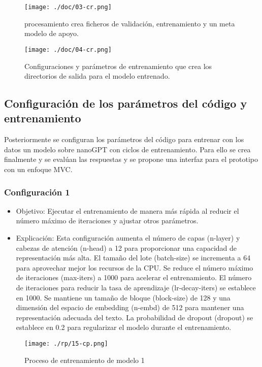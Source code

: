 \begin{figure}[H]
   \centering %
       \texttt{[image: ./doc/03-cr.png]} 
   \caption{procesamiento crea  ficheros de validación, entrenamiento y un meta modelo de apoyo.  \cite{}}
  \label{figure:Etapa de encoder}  %
\end{figure}
\begin{figure}[H]
   \centering %
       \texttt{[image: ./doc/04-cr.png]} 
   \caption{Configuraciones y parámetros de entrenamiento que crea los directorios de salida para el modelo entrenado.  \cite{}}
  \label{figure:Configuraciónes de parámetros}  %
\end{figure}
\subsection{Configuración de los parámetros del código y entrenamiento}\label{figure:Entrenamiento} 
Posteriormente se configuran los parámetros del código para entrenar con los datos un modelo sobre nanoGPT con ciclos de entrenamiento. Para ello se crea finalmente y se evalúan las respuestas y se propone una interfaz para el prototipo con un enfoque MVC.
\subsubsection{Configuración 1}\label{section:Configuracion1} 
\begin{itemize}
        \item   Objetivo: Ejecutar el entrenamiento de manera más rápida al reducir el número máximo de iteraciones y ajustar otros parámetros.
        \item   Explicación: Esta configuración aumenta el número de capas (n-layer) y cabezas de atención (n-head) a 12 para proporcionar una capacidad de representación más alta. El tamaño del lote (batch-size) se incrementa a 64 para aprovechar mejor los recursos de la CPU. Se reduce el número máximo de iteraciones (max-iters) a 1000 para acelerar el entrenamiento. El número de iteraciones para reducir la tasa de aprendizaje (lr-decay-iters) se establece en 1000. Se mantiene un tamaño de bloque (block-size) de 128 y una dimensión del espacio de embedding (n-embd) de 512 para mantener una representación adecuada del texto. La probabilidad de dropout (dropout) se establece en 0.2 para regularizar el modelo durante el entrenamiento.
    \end{itemize}
    \begin{figure}[H]
   \centering %
       \texttt{[image: ./rp/15-cp.png]} 
   \caption{Proceso de entrenamiento de modelo 1\cite{}}
  \label{figure:Resultado 1}  %
\end{figure}
